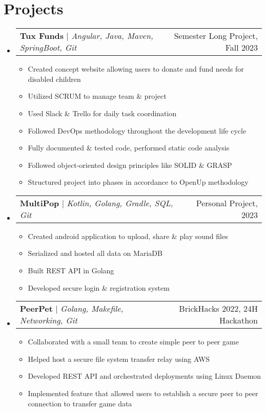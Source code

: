 \documentclass[letterpaper,11pt]{article}
\makeatletter
\newcommand{\resumeItem}[1]{
  \item\small{
    {#1 \vspace{-2pt}}
  }
}
\newcommand{\resumeProjectHeading}[2]{
    \item
    \begin{tabular*}{0.97\textwidth}{l@{\extracolsep{\fill}}r}
      \small#1 & #2 \\
    \end{tabular*}\vspace{-7pt}
}
\newcommand{\resumeSubHeadingListStart}{\begin{itemize}[leftmargin=0.15in, label={}]}
\newcommand{\resumeSubHeadingListEnd}{\end{itemize}}
\newcommand{\resumeItemListStart}{\begin{itemize}}
\newcommand{\resumeItemListEnd}{\end{itemize}\vspace{-5pt}}
\makeatother
\begin{document}
\section{Projects}
\resumeSubHeadingListStart
    \resumeProjectHeading
        {\textbf{Tux Funds} $|$ \emph{Angular, Java, Maven, SpringBoot, Git}}{Semester Long Project, Fall 2023}
    \resumeItemListStart
        \resumeItem{Created concept website allowing users to donate and fund needs for disabled children}
        \resumeItem{Utilized SCRUM to manage team \& project}
        \resumeItem{Used Slack \& Trello for daily task coordination}
        \resumeItem{Followed DevOps methodology throughout the development life cycle}
        \resumeItem{Fully documented \& tested code, performed static code analysis}
        \resumeItem{Followed object-oriented design principles like SOLID \& GRASP}
        \resumeItem{Structured project into phases in accordance to OpenUp methodology}
    \resumeItemListEnd
    \resumeProjectHeading
        {\textbf{MultiPop} $|$ \emph{Kotlin, Golang, Gradle, SQL, Git}}{Personal Project, 2023}
    \resumeItemListStart
        \resumeItem{Created android application to upload, share \& play sound files}
        \resumeItem{Serialized and hosted all data on MariaDB}
        \resumeItem{Built REST API in Golang}
        \resumeItem{Developed secure login \& registration system}
    \resumeItemListEnd
    \resumeProjectHeading
        {\textbf{PeerPet} $|$ \emph{Golang, Makefile, Networking, Git}}{BrickHacks 2022, 24H Hackathon}
    \resumeItemListStart
        \resumeItem{Collaborated with a small team to create simple peer to peer game}
        \resumeItem{Helped host a secure file system transfer relay using AWS}
        \resumeItem{Developed REST API and orchestrated deployments using Linux Daemon}
        \resumeItem{Implemented feature that allowed users to establish a secure peer to peer connection to transfer game data}
    \resumeItemListEnd

\resumeSubHeadingListEnd

\end{document}
